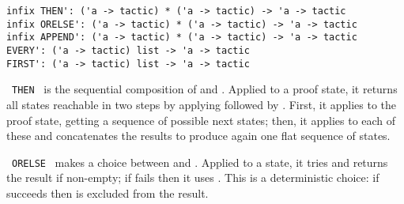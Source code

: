 \begin{isabellebody}
\begin{isamarkuptext}
\begin{mldecls}
  \verb|infix THEN': ('a -> tactic) * ('a -> tactic) -> 'a -> tactic| \\
  \verb|infix ORELSE': ('a -> tactic) * ('a -> tactic) -> 'a -> tactic| \\
  \verb|infix APPEND': ('a -> tactic) * ('a -> tactic) -> 'a -> tactic| \\
  \verb|EVERY': ('a -> tactic) list -> 'a -> tactic| \\
  \verb|FIRST': ('a -> tactic) list -> 'a -> tactic| \\
  \end{mldecls}

  \begin{description}

  \item {}~\verb|THEN|~ is the sequential
  composition of  and .  Applied to a
  proof state, it returns all states reachable in two steps by
  applying  followed by .  First, it
  applies  to the proof state, getting a sequence of
  possible next states; then, it applies  to each of
  these and concatenates the results to produce again one flat
  sequence of states.

  \item {}~\verb|ORELSE|~ makes a choice
  between  and .  Applied to a state, it
  tries  and returns the result if non-empty; if  fails then it uses .  This is a deterministic
  choice: if  succeeds then  is excluded
  from the result.


\end{description}
\end{isamarkuptext}
\end{isabellebody}
